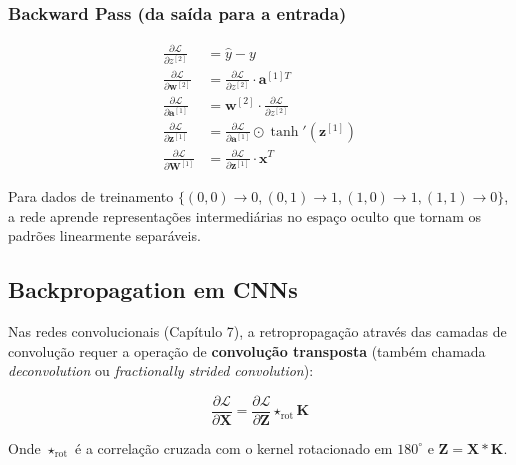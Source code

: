 \subsubsection*{Backward Pass (da saída para a entrada)}
\begin{align}
  \frac{\partial \mathcal{L}}{\partial z^{[2]}} &= \hat{y} - y \label{eq:bwd1} \\
  \frac{\partial \mathcal{L}}{\partial \mathbf{w}^{[2]}} &=
    \frac{\partial \mathcal{L}}{\partial z^{[2]}} \cdot \mathbf{a}^{[1]T} \label{eq:bwd2} \\
  \frac{\partial \mathcal{L}}{\partial \mathbf{a}^{[1]}} &=
    \mathbf{w}^{[2]} \cdot \frac{\partial \mathcal{L}}{\partial z^{[2]}} \label{eq:bwd3} \\
  \frac{\partial \mathcal{L}}{\partial \mathbf{z}^{[1]}} &=
    \frac{\partial \mathcal{L}}{\partial \mathbf{a}^{[1]}} \odot \tanh'(\mathbf{z}^{[1]}) \label{eq:bwd4} \\
  \frac{\partial \mathcal{L}}{\partial \mathbf{W}^{[1]}} &=
    \frac{\partial \mathcal{L}}{\partial \mathbf{z}^{[1]}} \cdot \mathbf{x}^T \label{eq:bwd5}
\end{align}

Para dados de treinamento $\{(0,0)\to0, (0,1)\to1, (1,0)\to1, (1,1)\to0\}$,
a rede aprende representações intermediárias no espaço oculto que tornam os
padrões linearmente separáveis.

\subsection{Backpropagation em CNNs}

Nas redes convolucionais (Capítulo 7), a retropropagação através das camadas
de convolução requer a operação de \textbf{convolução transposta} (também
chamada \textit{deconvolution} ou \textit{fractionally strided convolution}):

\begin{equation}
  \frac{\partial \mathcal{L}}{\partial \mathbf{X}} =
    \frac{\partial \mathcal{L}}{\partial \mathbf{Z}} \star_{\text{rot}} \mathbf{K}
  \label{eq:conv-backward}
\end{equation}

Onde $\star_{\text{rot}}$ é a correlação cruzada com o kernel rotacionado em
$180^\circ$ e $\mathbf{Z} = \mathbf{X} \ast \mathbf{K}$.


